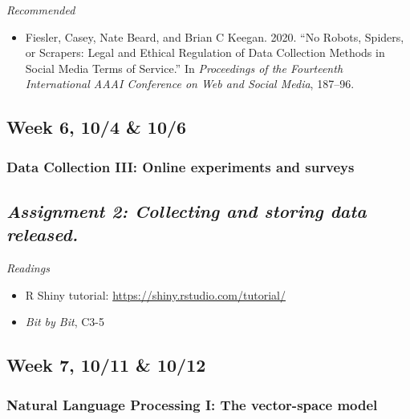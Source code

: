 \documentclass[
  10pt,
]{article}
\providecommand{\tightlist}{%
  \setlength{\itemsep}{0pt}\setlength{\parskip}{0pt}}
\begin{document}
\emph{Recommended}

\begin{itemize}
\tightlist
\item
  Fiesler, Casey, Nate Beard, and Brian C Keegan. 2020. ``No Robots,
  Spiders, or Scrapers: Legal and Ethical Regulation of Data Collection
  Methods in Social Media Terms of Service.'' In \emph{Proceedings of
  the Fourteenth International AAAI Conference on Web and Social Media},
  187--96.
\end{itemize}

\hypertarget{week-6-104-106}{%
\subsection{Week 6, 10/4 \& 10/6}\label{week-6-104-106}}

\hypertarget{data-collection-iii-online-experiments-and-surveys}{%
\subsubsection{Data Collection III: Online experiments and
surveys}\label{data-collection-iii-online-experiments-and-surveys}}

\hypertarget{assignment-2-collecting-and-storing-data-released.}{%
\subsection{\texorpdfstring{\emph{Assignment 2: Collecting and storing
data
released.}}{Assignment 2: Collecting and storing data released.}}\label{assignment-2-collecting-and-storing-data-released.}}

\emph{Readings}

\begin{itemize}
\tightlist
\item
  R Shiny tutorial: \url{https://shiny.rstudio.com/tutorial/}
\item
  \emph{Bit by Bit}, C3-5
\end{itemize}

\hypertarget{week-7-1011-1012}{%
\subsection{Week 7, 10/11 \& 10/12}\label{week-7-1011-1012}}

\hypertarget{natural-language-processing-i-the-vector-space-model}{%
\subsubsection{Natural Language Processing I: The vector-space
model}\label{natural-language-processing-i-the-vector-space-model}}
\end{document}
